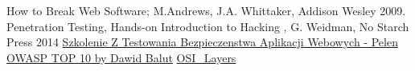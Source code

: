 \documentclass{article}[12pt]
\begin{document}

\begin{thebibliography}{9}
How to Break Web Software; M.Andrews, J.A. Whittaker, Addison Wesley 2009.
Penetration Testing, Hands-on Introduction to Hacking , G. Weidman, No Starch Press 2014
\href{https://www.youtube.com/watch?v=04c0JiE8YNQ}{Szkolenie Z Testowania Bezpieczenstwa Aplikacji Webowych - Pelen OWASP TOP 10 by Dawid Balut}
\href{https://www.webopedia.com/quick_ref/OSI_Layers.asp}{OSI\_Layers}

\end{thebibliography}
\end{document}
